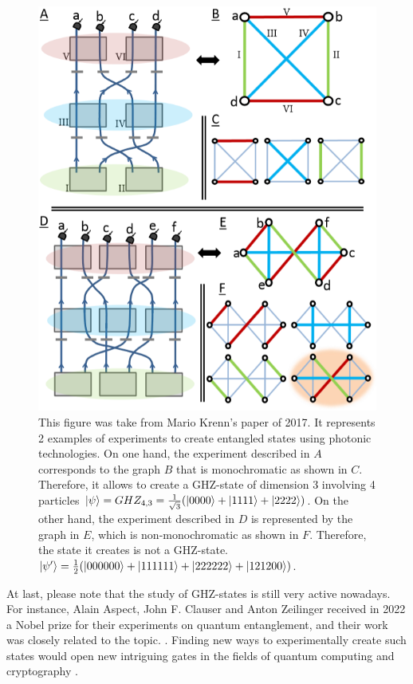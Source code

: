 \begin{figure}[H]
    \centering
    \includegraphics[scale=0.7]{figures/problem_presentation/motivations/krenn_graph.png}
    \caption{This figure was take from Mario Krenn's paper of 2017. \cite{Krenn_2017} It represents 2 examples of experiments to create entangled states using photonic technologies. On one hand, the experiment described in $A$ corresponds to the graph $B$ that is monochromatic as shown in $C$. Therefore, it allows to create a GHZ-state of dimension 3 involving 4 particles $\ket{\psi} = GHZ_{4, 3} = \frac{1}{\sqrt{3}} (\ket{0000} + \ket{1111} + \ket{2222})$. On the other hand, the experiment described in $D$ is represented by the graph in $E$, which is non-monochromatic as shown in $F$. Therefore, the state it creates is not a GHZ-state. $\ket{\psi'} = \frac{1}{2} (\ket{000000} + \ket{111111} + \ket{222222} + \ket{121200})$.}
    \label{fig:krenn_experiment}
\end{figure}

At last, please note that the study of GHZ-states is still very active nowadays. For instance, Alain Aspect, John F. Clauser and Anton Zeilinger received in 2022 a Nobel prize for their experiments on quantum entanglement, and their work was closely related to the topic. \cite{nobelprizeNobelPrize}. Finding new ways to experimentally create such states would open new intriguing gates in the fields of quantum computing \cite{gu2020compact} and cryptography \cite{pivoluska2018layered}.\\
